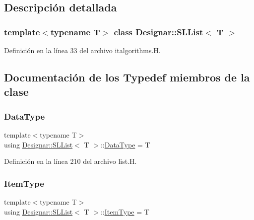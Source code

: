 \subsection{Descripción detallada}
\subsubsection*{template$<$typename T$>$\newline
class Designar\+::\+S\+L\+List$<$ T $>$}



Definición en la línea 33 del archivo italgorithms.\+H.



\subsection{Documentación de los \textquotesingle{}Typedef\textquotesingle{} miembros de la clase}
\mbox{\label{class_designar_1_1_s_l_list_aa98659227d90b392a1b52fa5e9b292f4}} 
\subsubsection{\texorpdfstring{Data\+Type}{DataType}}
{\footnotesize\ttfamily template$<$typename T$>$ \\
using \hyperlink{class_designar_1_1_s_l_list}{Designar\+::\+S\+L\+List}$<$ T $>$\+::\hyperlink{class_designar_1_1_s_l_list_aa98659227d90b392a1b52fa5e9b292f4}{Data\+Type} =  T}



Definición en la línea 210 del archivo list.\+H.

\mbox{\label{class_designar_1_1_s_l_list_a8ec47bfb6b0d74c8f85111b7b3c05cb2}} 
\subsubsection{\texorpdfstring{Item\+Type}{ItemType}}
{\footnotesize\ttfamily template$<$typename T$>$ \\
using \hyperlink{class_designar_1_1_s_l_list}{Designar\+::\+S\+L\+List}$<$ T $>$\+::\hyperlink{class_designar_1_1_s_l_list_a8ec47bfb6b0d74c8f85111b7b3c05cb2}{Item\+Type} =  T}



